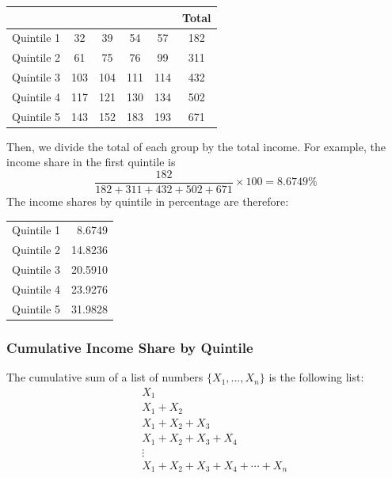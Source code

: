 \documentclass[letterpaper]{article}\usepackage[]{graphicx}\usepackage[]{color}
\numberwithin{exer}{section}
\theoremstyle{nonumberplain}
\begin{document}
\begin{center}
\begin{tabular}{lcccc||c}
  \hline
  &&&&&Total\\ \hline
Quintile 1 &  32 &  39 &  54 &  57 & 182 \\ 
  Quintile 2 &  61 &  75 &  76 &  99 & 311 \\ 
  Quintile 3 & 103 & 104 & 111 & 114 & 432 \\ 
  Quintile 4 & 117 & 121 & 130 & 134 & 502 \\ 
  Quintile 5 & 143 & 152 & 183 & 193 & 671 \\ 
   \hline
\end{tabular}

\end{center}
Then, we divide the total of each group by the total income. For
example, the income share in the first quintile is 
\[
\frac{182}{182+311+432+502+671}\times 100 = 
8.6749\%
\]
The income shares by quintile in percentage are therefore:
\begin{center}
\begin{tabular}{rr}
  \hline
  \hline
Quintile 1 & 8.6749 \\ 
  Quintile 2 & 14.8236 \\ 
  Quintile 3 & 20.5910 \\ 
  Quintile 4 & 23.9276 \\ 
  Quintile 5 & 31.9828 \\ 
   \hline
\end{tabular}

\end{center}

\subsubsection*{Cumulative Income Share by Quintile}

The cumulative sum of a list of numbers $\{X_1, ..., X_n\}$ is the following list:
\begin{eqnarray*}
&&X_1\\
&&X_1+X_2\\
&&X_1+X_2+X_3\\
&&X_1+X_2+X_3+X_4\\
&& \vdots\\
&& X_1+X_2+X_3+X_4+\cdots+X_n
\end{eqnarray*}
\end{document}
